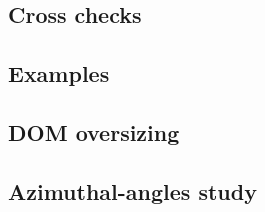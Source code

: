 \documentclass[green, 12pt]{beamer}
\begin{document}
\subsection{Cross checks}
  
  
  
  

\subsection{Examples}
  
  
  
  
  

%  

%  
%  

\subsection{DOM oversizing}
  

\subsection{Azimuthal-angles study}
  

%  

%  
%  
%  
\end{document}
